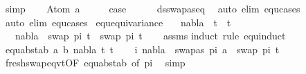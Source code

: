 \begin{isabellebody}
\ simp\isanewline
{}\isamarkupfalse%
\isanewline
\ \ \isamarkupfalse%
\ {\isacharparenleft}{\kern0pt}Atom\ a{\isacharparenright}{\kern0pt}\isanewline
\ \ \isamarkupfalse%
\ \isamarkupfalse%
\ {\isacharquery}{\kern0pt}case\isanewline
\ \ \ \ \isamarkupfalse%
\ ds{\isacharunderscore}{\kern0pt}swapas{\isacharunderscore}{\kern0pt}eq\ \isamarkupfalse%
\ {\isacharparenleft}{\kern0pt}auto\ elim{\isacharcolon}{\kern0pt}\ equ{\isachardot}{\kern0pt}cases{\isacharparenright}{\kern0pt}\isanewline
{}\isamarkupfalse%
\ {\isacharparenleft}{\kern0pt}auto\ elim{\isacharcolon}{\kern0pt}\ equ{\isachardot}{\kern0pt}cases{\isacharparenright}{\kern0pt}%
\endisatagproof
{\isafoldproof}%
%
\isadelimproof
\isanewline
%
\endisadelimproof
\isanewline
{}\isamarkupfalse%
\ equ{\isacharunderscore}{\kern0pt}equivariance{\isacharcolon}{\kern0pt}\isanewline
\ \ \ {\isachardoublequoteopen}nabla\ {\isasymturnstile}\ t{}\ {\isasymapprox}\ t{}{\isachardoublequoteclose}\isanewline
\ \ \ {\isachardoublequoteopen}nabla\ {\isasymturnstile}\ swap\ pi\ t{}\ {\isasymapprox}\ swap\ pi\ t{}{\isachardoublequoteclose}\isanewline
%
\isadelimproof
\ \ %
\endisadelimproof
%
\isatagproof
{}\isamarkupfalse%
\ assms\isanewline
{}\isamarkupfalse%
{\isacharparenleft}{\kern0pt}induct\ rule{\isacharcolon}{\kern0pt}\ equ{\isachardot}{\kern0pt}induct{\isacharparenright}{\kern0pt}\isanewline
\ \ \isamarkupfalse%
\ {\isacharparenleft}{\kern0pt}equ{\isacharunderscore}{\kern0pt}abst{\isacharunderscore}{\kern0pt}ab\ a\ b\ nabla\ t{}{\isacharprime}{\kern0pt}\ t{}{\isacharprime}{\kern0pt}{\isacharparenright}{\kern0pt}\isanewline
\ \ \isamarkupfalse%
\ i{\isacharcolon}{\kern0pt}\ {\isachardoublequoteopen}nabla\ {\isasymturnstile}\ swapas\ pi\ a\ {\isasymsharp}\ swap\ pi\ t{}{\isacharprime}{\kern0pt}{\isachardoublequoteclose}\isanewline
\ \ \ \ \isamarkupfalse%
\ fresh{\isacharunderscore}{\kern0pt}swap{\isacharunderscore}{\kern0pt}eqvt{\isacharbrackleft}{\kern0pt}OF\ equ{\isacharunderscore}{\kern0pt}abst{\isacharunderscore}{\kern0pt}ab{\isacharparenleft}{\kern0pt}{}{\isacharparenright}{\kern0pt}{\isacharcomma}{\kern0pt}\ of\ pi{\isacharbrackright}{\kern0pt}\ \isamarkupfalse%
\ simp\isanewline
\isanewline
\ \ \isamarkupfalse%

\end{isabellebody}
